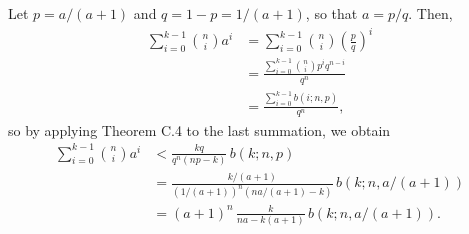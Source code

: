 \starred
Let $p=a/(a+1)$ and $q=1-p=1/(a+1)$, so that $a=p/q$.
Then,
\begin{align*}
    \sum_{i=0}^{k-1}\binom{n}{i}a^i &= \sum_{i=0}^{k-1}\binom{n}{i}\left(\frac{p}{q}\right)^i \\[1mm]
    &= \frac{\sum_{i=0}^{k-1}\binom{n}{i}p^iq^{n-i}}{q^n} \\[1mm]
    &= \frac{\sum_{i=0}^{k-1}b(i;n,p)}{q^n},
\end{align*}
so by applying Theorem C.4 to the last summation, we obtain
\begin{align*}
    \sum_{i=0}^{k-1}\binom{n}{i}a^i &< \frac{kq}{q^n(np-k)}\,b(k;n,p) \\
    &= \frac{k/(a+1)}{(1/(a+1))^n(na/(a+1)-k)}\,b(k;n,a/(a+1)) \\[1mm]
    &= (a+1)^n\,\frac{k}{na-k(a+1)}\,b(k;n,a/(a+1)).
\end{align*}
